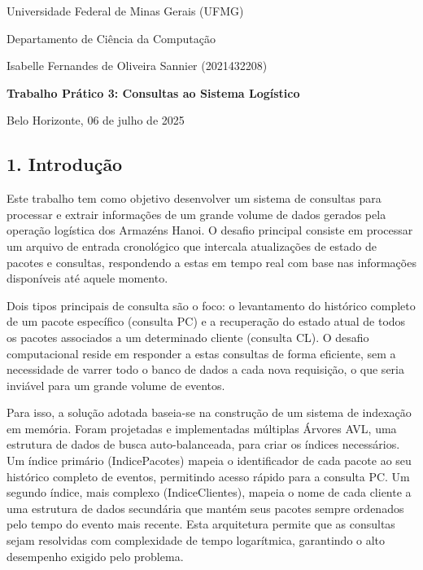 \documentclass[
  12pt,
]{article}
\author{Isabelle Fernandes de Oliveira Sannier}
\date{}
\begin{document}
\begin{titlepage}
\centering

{\large Universidade Federal de Minas Gerais (UFMG) \par}
\vspace{0.5cm}

{\large Departamento de Ciência da Computação \par}
\vspace{4cm}

{\large Isabelle Fernandes de Oliveira Sannier (2021432208)\par}
\vspace{5cm}

{\Large \textbf{Trabalho Prático 3: Consultas ao Sistema Logístico} \par}
\vspace{10cm}

{\large Belo Horizonte, 06 de julho de 2025 \par}


\end{titlepage}

\subsection{1. Introdução}\label{introduuxe7uxe3o}

Este trabalho tem como objetivo desenvolver um sistema de consultas para
processar e extrair informações de um grande volume de dados gerados
pela operação logística dos Armazéns Hanoi. O desafio principal consiste
em processar um arquivo de entrada cronológico que intercala
atualizações de estado de pacotes e consultas, respondendo a estas em
tempo real com base nas informações disponíveis até aquele momento.

Dois tipos principais de consulta são o foco: o levantamento do
histórico completo de um pacote específico (consulta PC) e a recuperação
do estado atual de todos os pacotes associados a um determinado cliente
(consulta CL). O desafio computacional reside em responder a estas
consultas de forma eficiente, sem a necessidade de varrer todo o banco
de dados a cada nova requisição, o que seria inviável para um grande
volume de eventos.

Para isso, a solução adotada baseia-se na construção de um sistema de
indexação em memória. Foram projetadas e implementadas múltiplas Árvores
AVL, uma estrutura de dados de busca auto-balanceada, para criar os
índices necessários. Um índice primário (IndicePacotes) mapeia o
identificador de cada pacote ao seu histórico completo de eventos,
permitindo acesso rápido para a consulta PC. Um segundo índice, mais
complexo (IndiceClientes), mapeia o nome de cada cliente a uma estrutura
de dados secundária que mantém seus pacotes sempre ordenados pelo tempo
do evento mais recente. Esta arquitetura permite que as consultas sejam
resolvidas com complexidade de tempo logarítmica, garantindo o alto
desempenho exigido pelo problema.
\end{document}
